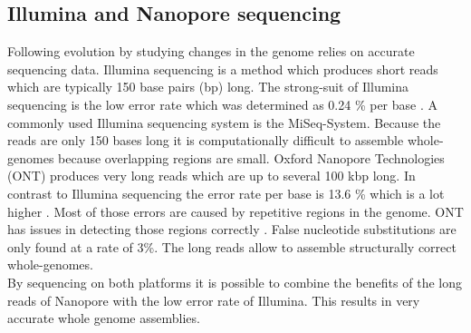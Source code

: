 \subsection{Illumina and Nanopore sequencing}
Following evolution by studying changes in the genome relies on accurate sequencing data. Illumina sequencing is a method which produces short reads which are typically 150 base pairs (bp) long. The strong-suit of Illumina sequencing is the low error rate which was determined as 0.24 \% per base \cite{pfeiffer_systematic_2018}. A commonly used Illumina sequencing system is the MiSeq-System. Because the reads are only 150 bases long it is computationally difficult to assemble whole-genomes because overlapping regions are small.  
Oxford Nanopore Technologies (ONT) produces very long reads which are up to several 100 kbp long. In contrast to Illumina sequencing the error rate per base is 13.6 \% which is a lot higher \cite{noauthor_resolving_nodate}. Most of those errors are caused by repetitive regions in the genome. ONT has issues in detecting those regions correctly \cite{noauthor_resolving_nodate}. False nucleotide substitutions are only found at a rate of 3\%. The long reads allow to assemble structurally correct whole-genomes. \\
By sequencing on both platforms it is possible to combine the benefits of the long reads of Nanopore with the low error rate of Illumina. This results in very accurate whole genome assemblies.


